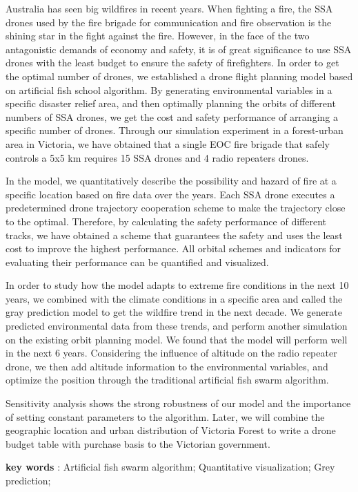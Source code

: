 \documentclass[13pt]{ctexart}
\begin{document}
\begin{adjustwidth}{1cm}{1cm}
\indent { }{ }{ }{ }{ }{ }Australia has seen big wildfires in recent years. When fighting a fire, the SSA drones used by the fire brigade for communication and fire observation is the shining star in the fight against the fire. However, in the face of the two antagonistic demands of economy and safety, it is of great significance to use SSA drones with the least budget to ensure the safety of firefighters.
In order to get the optimal number of drones, we established a drone flight planning model based on artificial fish school algorithm. By generating environmental variables in a specific disaster relief area, and then optimally planning the orbits of different numbers of SSA drones, we get the cost and safety performance of arranging a specific number of drones. Through our simulation experiment in a forest-urban area in Victoria, we have obtained that a single EOC fire brigade that safely controls a 5x5 km requires 15 SSA drones and 4 radio repeaters drones.

In the model, we quantitatively describe the possibility and hazard of fire at a specific location based on fire data over the years. Each SSA drone executes a predetermined drone trajectory cooperation scheme to make the trajectory close to the optimal. Therefore, by calculating the safety performance of different tracks, we have obtained a scheme that guarantees the safety and uses the least cost to improve the highest performance. All orbital schemes and indicators for evaluating their performance can be quantified and visualized.

In order to study how the model adapts to extreme fire conditions in the next 10 years, we combined with the climate conditions in a specific area and called the gray prediction model to get the wildfire trend in the next decade. We generate predicted environmental data from these trends, and perform another simulation on the existing orbit planning model. We found that the model will perform well in the next 6 years.
Considering the influence of altitude on the radio repeater drone, we then add altitude information to the environmental variables, and optimize the position through the traditional artificial fish swarm algorithm.

Sensitivity analysis shows the strong robustness of our model and the importance of setting constant parameters to the algorithm. Later, we will combine the geographic location and urban distribution of Victoria Forest to write a drone budget table with purchase basis to the Victorian government.


\vspace{10pt}
\textbf{key words} : Artificial fish swarm algorithm; Quantitative visualization; Grey prediction; 
\end{adjustwidth} 
\end{document}
